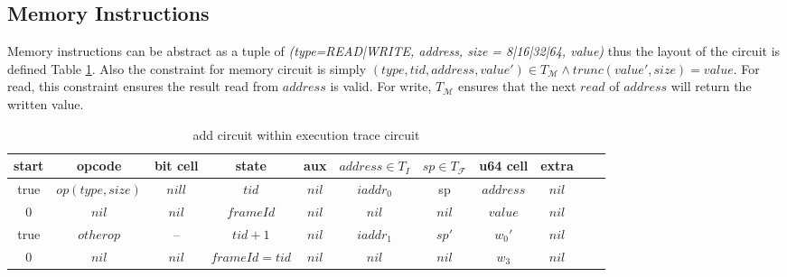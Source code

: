 \subsection{Memory Instructions}
Memory instructions can be abstract as a tuple of \emph{(type=READ|WRITE, address, size = 8|16|32|64, value)} thus the layout of the circuit is defined Table \ref{tbl:memory-instruction}. Also the constraint for memory circuit is simply $(type, tid, address, value') \in T_\mathcal{M} \wedge trunc(value', size) = value$. For read, this constraint ensures the result read from $address$ is valid. For write, $T_\mathcal{M}$ ensures that the next $read$ of $address$ will return the written value.
\begin{table}[!h]
\begin{center}
\begin{tabular}{ | c | c | c | c | c | c | c | c | c | c | c | }
  \hline
  start & opcode & bit cell & state & aux & $address \in T_{I}$ & $sp \in T_\mathcal{F}$& u64 cell & extra \\ 
  \hline
   true & $op(type, size)$ & $nill$ & $tid$ & $nil$ & $iaddr_0$ & sp & $address$ & $nil$\\ 
 \hline
   0 & $nil$ & $nil$ & $frameId$ & $nil$ & $nil$ & $nil$ & $value$ & $nil$\\ 
 \hline
   true & $otherop$ & -- & $tid + 1$ & $nil$ & $iaddr_1$ & $sp'$ & $w_0'$ & $nil$\\
 \hline
   0 & $nil$ & $nil$ & $frameId = tid$ & $nil$ & $nil$ & $nil$ & $w_3$ & $nil$\\ 
 \hline
\end{tabular}
\caption{add circuit within execution trace circuit}
\label{tbl:memory-instruction}
\end{center}
\end{table}